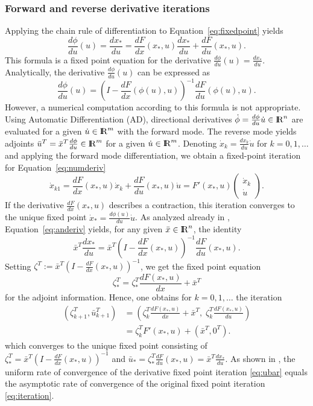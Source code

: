 \documentclass[11pt,twoside]{article}
\newcommand{\R}{{ {\rm I} \kern -.225em {\rm R} }}
\begin{document}
\subsubsection{Forward and reverse derivative iterations}
%
Applying the chain rule of differentiation to Equation~\eqref{eq:fixedpoint} yields
\begin{equation}
\label{eq:numderiv}
 \frac{d\phi}{du}(u) =
 \frac{dx_*}{du} = \frac{dF}{dx}(x_*,u)\frac{dx_*}{du} +
                       \frac{dF}{du}(x_*,u).
\end{equation}
This formula is a fixed point equation for the derivative
$\frac{d\phi}{du}(u) = \frac{dx_*}{du}$.
Analytically, the derivative $\frac{d\phi}{du}(u)$
can be expressed as
\begin{equation}
\label{eq:anderiv}
 \frac{d\phi}{du}(u) =
 \left(I - \frac{dF}{dx}(\phi(u),u)\right)^{-1}
 \frac{dF}{du}(\phi(u),u).
\end{equation}
However, a numerical computation according to this
formula is not appropriate. Using Automatic Differentiation (AD),
directional derivatives $\dot \phi = \frac{d\phi}{du}\dot u \in \R^{n}$
are evaluated for a given $\dot u \in \R^m$ with the forward mode. The reverse
mode yields adjoints $\bar u^T = \bar x^T \frac{d\phi}{du} \in \R^{m}$
for a given $\dot u \in \R^m$.
Denoting $\dot x_k = \frac{dx_k}{du}\dot u$ for $k=0,1,\ldots$ and applying
the forward mode differentiation,
we obtain a fixed-point iteration for Equation~\eqref{eq:numderiv}
\begin{equation}
\label{eq:xdot}
  \dot x_{k1} = \frac{dF}{dx}(x_*,u) \dot x_k +
                 \frac{dF}{du}(x_*,u)\dot u
   = F'(x_*,u)
    \begin{pmatrix} \dot x_k \\ \dot u \end{pmatrix}.
\end{equation}
If the derivative $\frac{dF}{dx}(x_*,u)$ describes a contraction, this iteration
converges to the unique fixed point $\dot x_*=\frac{d\phi(u)}{du}\dot u$.
As analyzed already in \cite{Chr94},  Equation~\eqref{eq:anderiv} yields,
for any given $\bar x\in\R^n$, the identity
$$
\bar x^T\frac{dx_*}{du} = \bar x^T
  \left(I - \frac{dF}{dx}(x_*,u)\right)^{-1}
  \frac{dF}{du}(x_*,u).
$$
Setting $\zeta^T := \bar x^T\left(I - \frac{dF}{dx}(x_*,u)\right)^{-1}$,
we get the fixed point equation
$$
  \zeta_*^T = \zeta_*^T\frac{dF(x_*,u)}{dx} + \bar x^T
$$
for the adjoint information. Hence, one obtains for $k=0,1,\ldots$ the iteration
\begin{align}
 \nonumber
 (\zeta_{k+1}^T, \bar u_{k+1}^T)
 & =
  \left(\zeta_k^T\frac{dF(x_*,u)}{dx} + \bar x^T, \;
        \zeta_k^T\frac{dF(x_*,u)}{du}\right) \\
 \label{eq:ubar}
 & =
 \zeta_k^T F'(x_*,u) + (\bar x^T, 0^T).
\end{align}
which converges to the unique fixed point consisting of
$\zeta_*^T=\bar x^T\left(I - \frac{dF}{dx}(x_*,u)\right)^{-1}$
and
$\bar u_* = \zeta_*^T\frac{dF}{du}(x_*,u) = \bar x^T\frac{dx_*}{du} $.
As shown in \cite{Chr94}, the uniform rate of convergence of the
derivative fixed point iteration \eqref{eq:ubar} equals the
asymptotic rate of convergence of the original fixed point iteration
\eqref{eq:iteration}.
\end{document}

